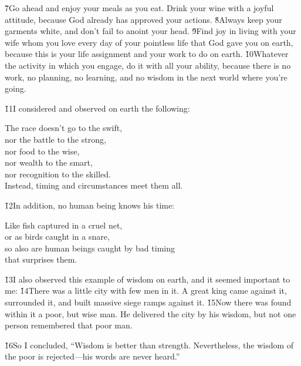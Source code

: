 \v{7}Go ahead and enjoy your meals as you eat. Drink your wine with a joyful attitude, because God already has approved your actions. \v{8}Always keep your garments white, and don't fail to anoint your head. \v{9}Find joy in living with your wife whom you love every day of your pointless life that God gave you on earth, because this is your life assignment and your work to do on earth. \v{10}Whatever the activity in which you engage, do it with all your ability, because there is no work, no planning, no learning, and no wisdom in the next world where you're going.

\v{11}I considered and observed on earth the following:

\begin{poetry}
\poeml The race doesn't go to the swift, \\
\poemll    nor the battle to the strong, \\
\poeml nor food to the wise, \\
\poemll    nor wealth to the smart, \\
\poeml nor recognition to the skilled. \\
\poemll    Instead, timing and circumstances meet them all.
\end{poetry}

\v{12}In addition, no human being knows his time:

\begin{poetry}
\poeml Like fish captured in a cruel net, \\
\poemll    or as birds caught in a snare, \\
\poeml so also are human beings caught by bad timing \\
\poemll    that surprises them.
\end{poetry}

\v{13}I also observed this example of wisdom on earth, and it seemed important to me: \v{14}There was a little city with few men in it. A great king came against it, surrounded it, and built massive siege ramps against it. \v{15}Now there was found within it a poor, but wise man. He delivered the city by his wisdom, but not one person remembered that poor man.

\v{16}So I concluded, ``Wisdom is better than strength. Nevertheless, the wisdom of the poor is rejected---his words are never heard.''

